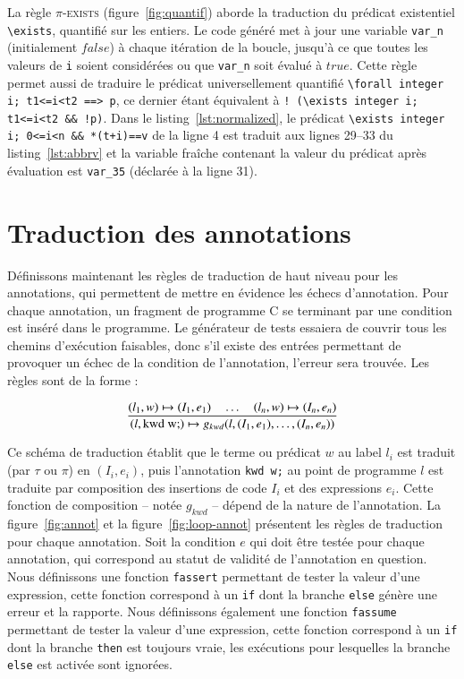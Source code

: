 La règle \textsc{$\pi$-exists} (figure~\ref{fig:quantif}) aborde la traduction
du prédicat existentiel \lstinline'\exists', quantifié sur les entiers.
Le code généré met à jour une variable \lstinline'var_n' (initialement $false$)
à chaque itération de la boucle, jusqu'à ce que toutes les valeurs de
\lstinline'i' soient considérées ou que \lstinline'var_n' soit évalué à $true$.
Cette règle permet aussi de traduire le prédicat universellement quantifié
\lstinline{\forall integer i; t1<=i<t2 ==> p}, ce dernier étant équivalent à
\lstinline{! (\exists integer i; t1<=i<t2 && !p)}.
Dans le listing~\ref{lst:normalized}, le prédicat
\lstinline{\exists integer i; 0<=i<n && *(t+i)==v} de la ligne 4 est traduit
aux lignes 29--33 du listing~\ref{lst:abbrv} et la variable fraîche contenant la
valeur du prédicat après évaluation est \lstinline|var_35| (déclarée à la
ligne 31).


\section{Traduction des annotations \eacsl}
\label{sec:annot}


Définissons maintenant les règles de traduction de haut niveau pour les
annotations, qui permettent de mettre en évidence les échecs d'annotation.
Pour chaque annotation, un fragment de programme C se terminant par une
condition est inséré dans le programme.
Le générateur de tests essaiera de couvrir tous les chemins d'exécution
faisables, donc s'il existe des entrées permettant de provoquer un échec de la
condition de l'annotation, l'erreur sera trouvée.
Les règles sont de la forme :


\[
\dfrac
    {(l_1, w) \rulearrow (I_1, e_1) \quad \ldots \quad
      (l_n, w) \rulearrow (I_n, e_n)}
    {(l, \mbox{\lstinline'kwd w;'}) \rulearrow
      g_{kwd} (l, (I_1, e_1), \ldots, (I_n, e_n))}
\]


Ce schéma de traduction établit que le terme ou prédicat $w$ au label $l_i$ est
traduit (par $\tau$ ou $\pi$) en $(I_i, e_i)$, puis l'annotation
\lstinline'kwd w;' au point de programme $l$ est traduite par composition
des insertions de code $I_i$ et des expressions $e_i$.
Cette fonction de composition -- notée $g_{kwd}$ -- dépend de la nature de
l'annotation.
La figure~\ref{fig:annot} et la figure~\ref{fig:loop-annot} présentent les
règles de traduction pour chaque annotation.
Soit la condition $e$ qui doit être testée pour chaque annotation, qui
correspond au statut de validité de l'annotation en question.
Nous définissons une fonction \lstinline'fassert' permettant de tester la valeur
d'une expression, cette fonction correspond à un \lstinline'if' dont la branche
\lstinline'else' génère une erreur et la rapporte.
Nous définissons également une fonction \lstinline'fassume' permettant de tester
la valeur d'une expression, cette fonction correspond à un \lstinline'if' dont
la branche \lstinline'then' est toujours vraie, les exécutions pour lesquelles
la branche \lstinline'else' est activée sont ignorées.

